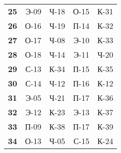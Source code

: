\documentclass[12pt]{article}
\begin{document}
\begin{multicols}{3}
\begin{tabular}{c|rrrr}
\textbf{25} & {Э-09} & {Ч-18} & {О-15} & {К-31} \\
\textbf{26} & {О-16} & {Ч-19} & {П-14} & {К-32} \\
\textbf{27} & {О-17} & {Ч-08} & {Э-10} & {К-33} \\
\textbf{28} & {О-18} & {Ч-14} & {Э-11} & {Ч-20} \\
\textbf{29} & {С-13} & {К-34} & {П-15} & {К-35} \\
\textbf{30} & {С-14} & {Ч-12} & {П-16} & {К-12} \\
\textbf{31} & {Э-05} & {Ч-21} & {П-17} & {К-36} \\
\textbf{32} & {Э-12} & {К-23} & {Э-13} & {К-37} \\
\textbf{33} & {П-09} & {К-38} & {П-17} & {К-39} \\
\textbf{34} & {О-13} & {Ч-05} & {С-15} & {К-24} \\
\end{tabular}

\end{multicols}

\clearpage

%
%
\setcounter{tocdepth}{1}
\tableofcontents
%
%
\end{document}

